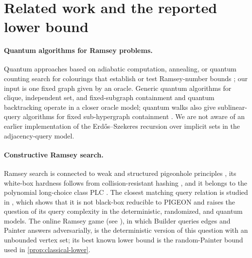 \section{Related work and the reported lower bound}
\label{sec:prior-art}

\paragraph{Quantum algorithms for Ramsey problems.}
Quantum approaches based on adiabatic computation, annealing, or quantum
counting search for colourings that establish or test Ramsey-number bounds
\cite{GaitanClark2012,BianEtAl2013,Wang2016,QuLiWangBaoCao2013,
RanjbarMacreadyClarkGaitan2016,PionMniszewski2025}; our input is one fixed
graph given by an oracle.  Generic quantum algorithms
for clique, independent set, and fixed-subgraph containment
\cite{Doern2005,ChildsEisenberg2005,LeeMagniezSantha2012,Zhu2012} and
quantum backtracking \cite{Montanaro2018} operate in a closer oracle model;
quantum walks also give sublinear-query algorithms for fixed
sub-hypergraph containment \cite{LeGallNishimuraTani2016}.  We are not aware
of an earlier implementation of the Erd\H{o}s--Szekeres
recursion over implicit sets in the adjacency-query model.

\paragraph{Constructive Ramsey search.}
Ramsey search is connected to weak and structured pigeonhole principles
\cite{Krajicek2001,Krajicek2005}, its white-box hardness follows from
collision-resistant hashing \cite{KomargodskiNaorYogev2019}, and it belongs
to the polynomial long-choice class PLC
\cite{PasarkarPapadimitriouYannakakis2023}.  The closest matching query
relation is studied in \cite{JainLiRobereXun2024}, which shows that it is
not black-box reducible to PIGEON and raises the question of its query
complexity in the deterministic, randomized, and quantum models.  The
online Ramsey game (see \cite{ConlonFoxGrinshpunHe2019}), in which Builder
queries edges and Painter answers adversarially, is the deterministic
version of this question with an unbounded vertex set; its best known lower
bound is the random-Painter bound used in \cref{prop:classical-lower}.


